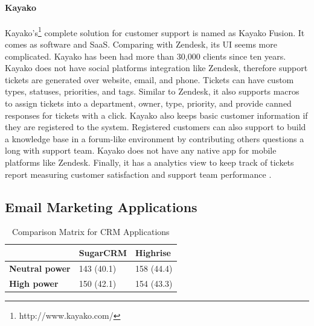 \paragraph{Kayako}
Kayako's\footnote{http://www.kayako.com/} complete solution for customer support is named as Kayako Fusion. It comes as software and \ac{SaaS}. Comparing with Zendesk, its \ac{UI} seems more complicated. Kayako has been had more than 30,000 clients since ten years. Kayako does not have social platforms integration like Zendesk, therefore support tickets are generated over website, email, and phone. Tickets can have custom types, statuses, priorities, and tags. Similar to Zendesk, it also supports macros to assign tickets into a department, owner, type, priority, and provide canned responses for tickets with a click. Kayako also keeps basic customer information if they are registered to the system. Registered customers can also support to build a knowledge base in a forum-like environment by contributing others questions a long with support team. Kayako does not have any native app for mobile platforms like Zendesk. Finally, it has a analytics view to keep track of tickets report measuring customer satisfaction and support team performance \citep{KayakoInc.2013,KayakoInc.2013a}.

\subsection{Email Marketing Applications}
\label{subsec:3.1.3:EmaiMarktAppl}

\begin{table}[!ht]
\begin{center}
	\caption[Comparison Matrix for CRM Applications]{Comparison Matrix for CRM Applications} \label{tab:comp_matr_crm}
    \begin{tabular}{ p{3cm} p{3cm}  p{3cm} }
	\hline
	& \textbf{SugarCRM} & \textbf{Highrise} \\ \hline
	\textbf{Neutral power} & 143 (40.1) & 158 (44.4) \\
	\textbf{High power} & 150 (42.1) & 154 (43.3) \\ \hline
    \end{tabular}
\end{center}
\end{table}

